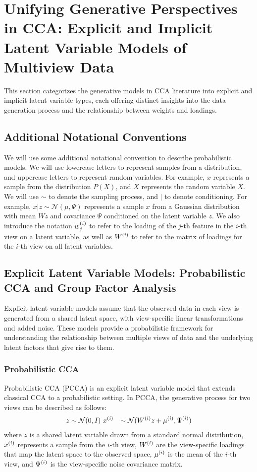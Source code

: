 \section{Unifying Generative Perspectives in CCA: Explicit and Implicit Latent Variable Models of Multiview Data}

This section categorizes the generative models in CCA literature into explicit and implicit latent variable types, each offering distinct insights into the data generation process and the relationship between weights and loadings.

\subsection{Additional Notational Conventions}

We will use some additional notational convention to describe probabilistic models.
We will use lowercase letters to represent samples from a distribution, and uppercase letters to represent random variables.
For example, \(x\) represents a sample from the distribution \(P(X)\), and \(X\) represents the random variable \(X\).
We will use $\sim$ to denote the sampling process, and $|$ to denote conditioning.
For example, \(x | z \sim \mathcal{N}(\mu, \Psi)\) represents a sample \(x\) from a Gaussian distribution with mean \(Wz\) and covariance \(\Psi\) conditioned on the latent variable \(z\).
We also introduce the notation \(w^{(i)}_{j}\) to refer to the loading of the \(j\)-th feature in the \(i\)-th view on a latent variable, as well as \(W^{(i)}\) to refer to the matrix of loadings for the \(i\)-th view on all latent variables.

\subsection{Explicit Latent Variable Models: Probabilistic CCA and Group Factor Analysis}

Explicit latent variable models assume that the observed data in each view is generated from a shared latent space, with view-specific linear transformations and added noise. These models provide a probabilistic framework for understanding the relationship between multiple views of data and the underlying latent factors that give rise to them.

\subsubsection{Probabilistic CCA}
Probabilistic CCA (PCCA) is an explicit latent variable model that extends classical CCA to a probabilistic setting. In PCCA, the generative process for two views can be described as follows:
\begin{align}
z &\sim \mathcal{N}(0, I)\
x^{(i)} &\sim \mathcal{N}(W^{(i)} z + \mu^{(i)}, \Psi^{(i)})
\end{align}
where $z$ is a shared latent variable drawn from a standard normal distribution, $x^{(i)}$ represents a sample from the $i$-th view, $W^{(i)}$ are the view-specific loadings that map the latent space to the observed space, $\mu^{(i)}$ is the mean of the $i$-th view, and $\Psi^{(i)}$ is the view-specific noise covariance matrix.

